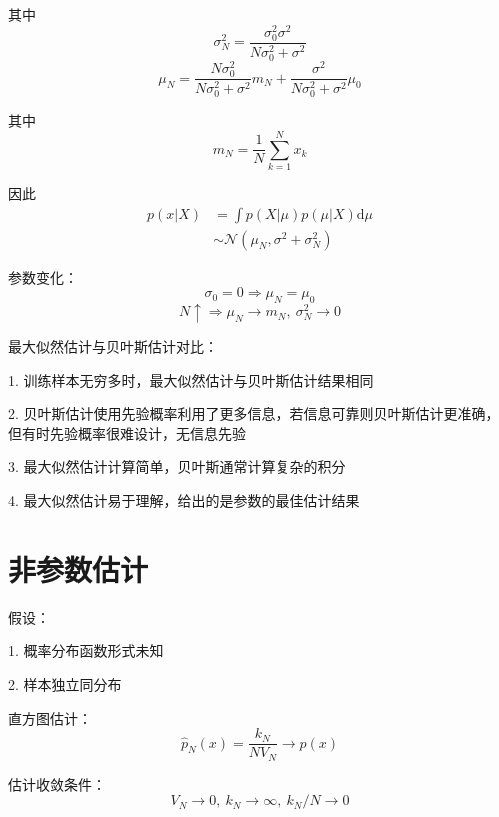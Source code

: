\documentclass[openany]{ctexbook}
\theoremstyle{kaiti}
\theoremstyle{normal}
\begin{document}
其中
\begin{equation}
\sigma_{N}^{2}=\frac{\sigma_{0}^{2}\sigma^2}{N\sigma_{0}^{2}+\sigma^2}
\end{equation}
\begin{equation}
\mu_N=\frac{N\sigma_{0}^{2}}{N\sigma_{0}^{2}+\sigma^2}m_N+\frac{\sigma^2}{N\sigma_{0}^{2}+\sigma^2}\mu_0
\end{equation}

其中
\begin{equation}
m_N=\frac{1}{N}\sum_{k=1}^N{x_k}
\end{equation}

因此
\begin{equation}
\begin{aligned}
  p\left(x|X \right)
  &=\int{p(X|\mu)p(\mu|X)\mathrm{d}\mu}\\
  &\sim \mathcal{N} \left(\mu_N,\sigma^2+\sigma_{N}^{2} \right)
\end{aligned}
\end{equation}

参数变化：
\begin{equation}
\sigma_0=0\Rightarrow \mu_N=\mu_0
\end{equation}
\begin{equation}
N\uparrow \Rightarrow \mu_N\rightarrow m_N,~\sigma_{N}^{2}\rightarrow 0
\end{equation}

最大似然估计与贝叶斯估计对比：

1. 训练样本无穷多时，最大似然估计与贝叶斯估计结果相同

2. 贝叶斯估计使用先验概率利用了更多信息，若信息可靠则贝叶斯估计更准确，但有时先验概率很难设计，无信息先验

3. 最大似然估计计算简单，贝叶斯通常计算复杂的积分

4. 最大似然估计易于理解，给出的是参数的最佳估计结果

\section{非参数估计}

假设：

1. 概率分布函数形式未知

2. 样本独立同分布

直方图估计：
\begin{equation}
\hat{p}_N(x)
=\frac{k_N}{NV_N}
\rightarrow p(x)
\end{equation}

估计收敛条件：
\begin{equation}
V_N\rightarrow 0,~k_N\rightarrow \infty ,~k_N/N\rightarrow 0
\end{equation}
\end{document}
